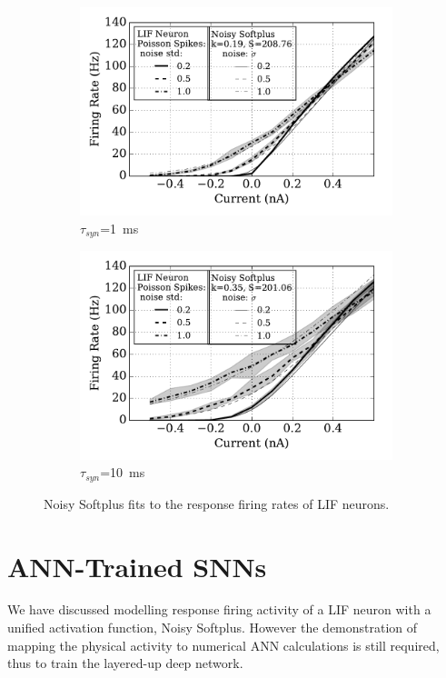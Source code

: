 	\begin{figure}
		\centering
		\begin{subfigure}[t]{0.49\textwidth}
			\includegraphics[width=\textwidth]{pics_iconip/4-1.pdf}
			\caption{$\tau_{syn}$=1~ms}
		\end{subfigure}
		\begin{subfigure}[t]{0.49\textwidth}
			\includegraphics[width=\textwidth]{pics_iconip/4-10.pdf}
			\caption{$\tau_{syn}$=10~ms}
		\end{subfigure}
		\caption{Noisy Softplus fits to the response firing rates of LIF neurons.}
		\label{Fig:nsptau1}
	\end{figure}		
	
	
\section{ANN-Trained SNNs}	
	We have discussed modelling response firing activity of a LIF neuron with a unified activation function, Noisy Softplus.
	However the demonstration of mapping the physical activity to numerical ANN calculations is still required, thus to train the layered-up deep network.
	
